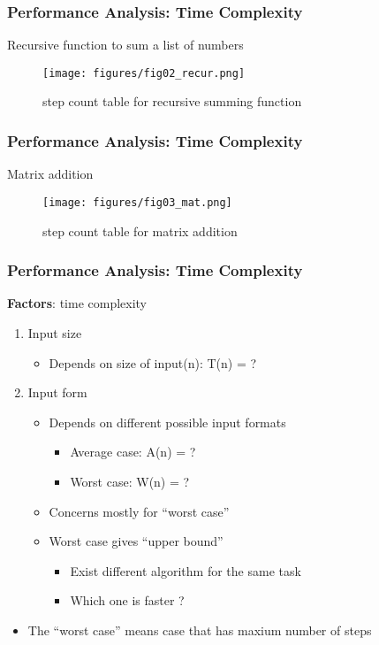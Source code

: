 \documentclass[newPxFont,sthlmFooter,nooffset]{beamer}
\begin{document}
\begin{frame}[t]
  \frametitle{Performance Analysis: Time Complexity}
Recursive function to sum a list of numbers
  \begin{figure}[h]
    \centering
    \texttt{[image: figures/fig02\_recur.png]}
    \caption{step count table for recursive summing function}
  \end{figure}
\end{frame}

\begin{frame}[t]
  \frametitle{Performance Analysis: Time Complexity}
Matrix addition
  \begin{figure}[h]
    \centering
    \texttt{[image: figures/fig03\_mat.png]}
    \caption{step count table for matrix addition}
  \end{figure}
\end{frame}


\begin{frame}[t]
  \frametitle{Performance Analysis: Time Complexity}
\textbf{Factors}: time complexity 
\begin{enumerate}
\item Input size
  \begin{itemize}
  \item Depends on size of input(n): T(n) = ?
  \end{itemize}

\item Input form
  \begin{itemize}
  \item Depends on different possible input formats
    \begin{itemize}
    \item Average case: A(n) = ?
    \item Worst case: W(n) = ?
    \end{itemize}

  \item Concerns mostly for ``worst case''
  \item Worst case gives ``upper bound''
    \begin{itemize}
    \item Exist different algorithm for the same task
    \item Which one is faster ?
    \end{itemize}
  \end{itemize}
\end{enumerate}
\begin{itemize}
	\item The ``worst case'' means case that has maxium number of steps 
\end{itemize}

\end{frame}
\end{document}
